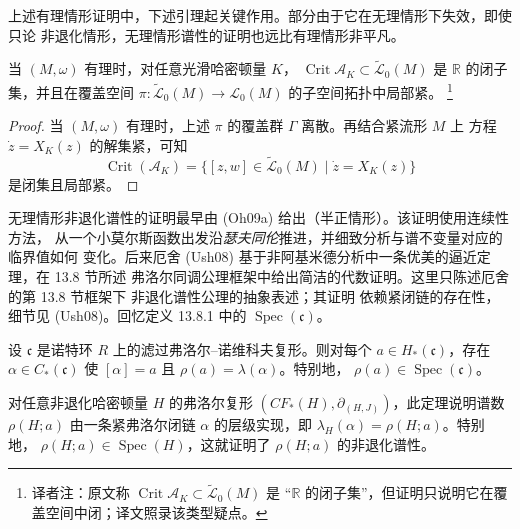 上述有理情形证明中，下述引理起关键作用。部分由于它在无理情形下失效，即使只论
非退化情形，无理情形谱性的证明也远比有理情形非平凡。

\begin{lemma}
\label{lem:21-rational-critical-set-compactness}
当 $(M,\omega)$ 有理时，对任意光滑哈密顿量 $K$，
$\operatorname{Crit}\mathcal A_K\subset\widetilde{\mathcal L}_0(M)$ 是
$\mathbb R$ 的闭子集，并且在覆盖空间
$\pi:\widetilde{\mathcal L}_0(M)\to\mathcal L_0(M)$ 的子空间拓扑中局部紧。
\footnote{译者注：原文称
$\operatorname{Crit}\mathcal A_K\subset\widetilde{\mathcal L}_0(M)$ 是
“$\mathbb R$ 的闭子集”，但证明只说明它在覆盖空间中闭；译文照录该类型疑点。}
\end{lemma}

\begin{proof}
当 $(M,\omega)$ 有理时，上述 $\pi$ 的覆盖群 $\Gamma$ 离散。再结合紧流形 $M$ 上
方程 $\dot z=X_K(z)$ 的解集紧，可知
\[
 \operatorname{Crit}(\mathcal A_K)
 =\{[z,w]\in\widetilde{\mathcal L}_0(M)\mid\dot z=X_K(z)\}
\]
是闭集且局部紧。
\end{proof}

无理情形非退化谱性的证明最早由 (Oh09a) 给出（半正情形）。该证明使用连续性方法，
从一个小莫尔斯函数出发沿\emph{瑟夫同伦}推进，并细致分析与谱不变量对应的临界值如何
变化。后来厄舍 (Ush08) 基于非阿基米德分析中一条优美的逼近定理，在 13.8 节所述
弗洛尔同调公理框架中给出简洁的代数证明。这里只陈述厄舍的第 13.8 节框架下
非退化谱性公理的抽象表述；其证明
依赖紧闭链的存在性，细节见 (Ush08)。回忆定义 13.8.1 中的
$\operatorname{Spec}(\mathfrak c)$。

\begin{theorem}[定理 1.4 (Ush08)]
\label{thm:21-usher-spectrality}
设 $\mathfrak c$ 是诺特环 $R$ 上的滤过弗洛尔--诺维科夫复形。则对每个
$a\in H_*(\mathfrak c)$，存在 $\alpha\in C_*(\mathfrak c)$ 使
$[\alpha]=a$ 且 $\rho(a)=\lambda(\alpha)$。特别地，
$\rho(a)\in\operatorname{Spec}(\mathfrak c)$。
\end{theorem}

对任意非退化哈密顿量 $H$ 的弗洛尔复形
$(CF_*(H),\partial_{(H,J)})$，此定理说明谱数 $\rho(H;a)$ 由一条紧弗洛尔闭链
$\alpha$ 的层级实现，即 $\lambda_H(\alpha)=\rho(H;a)$。特别地，
$\rho(H;a)\in\operatorname{Spec}(H)$，这就证明了 $\rho(H;a)$ 的非退化谱性。
